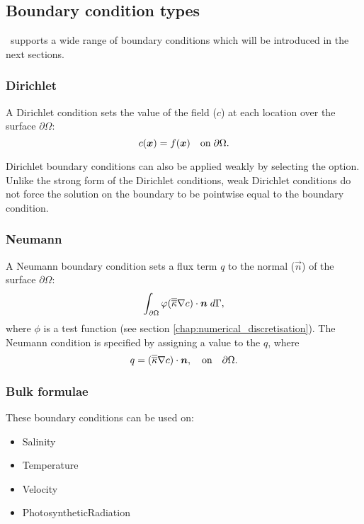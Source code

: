 \subsection{Boundary condition types}\label{sec:BCs:types}
\fluidity\ supports a wide range of boundary conditions which will be introduced in the next sections.

\subsubsection{Dirichlet}

A Dirichlet condition sets the value of the field ($c$) at each location over the surface $\partial\Omega$:
\begin{equation*}
c({\mbox{\boldmath$x$}}) = f({\mbox{\boldmath$x$}}) \quad \textrm{on}\; \partial\Omega.
\end{equation*}

Dirichlet boundary conditions can also be applied weakly by selecting the 
option. Unlike the strong form of the Dirichlet conditions, weak Dirichlet
conditions do not force the solution on the boundary to be pointwise equal
to the boundary condition. 

\subsubsection{Neumann}

A Neumann boundary condition sets a flux term $q$ to the normal ($\vec n$) of the surface $\partial\Omega$:
\begin{equation*}
\int_{\partial\Omega} \varphi (\overline{\overline{\kappa}}\nabla c)\cdot{\mbox{\boldmath$n$}} \;d\Gamma,
\end{equation*}
where $\phi$ is a test function (see section \ref{chap:numerical_discretisation}).
The Neumann condition is specified by assigning a value to the $q$, where
\begin{equation*}
q = (\overline{\overline{\kappa}}\nabla c)\cdot{\mbox{\boldmath$n$}},\quad \textrm{on}\quad \partial\Omega.
\end{equation*}

\subsubsection{Bulk formulae}\label{sec:bulk_formulae}

These boundary conditions can be used on:
\begin{itemize}
\item Salinity
\item Temperature
\item Velocity
\item PhotosyntheticRadiation
\end{itemize}

